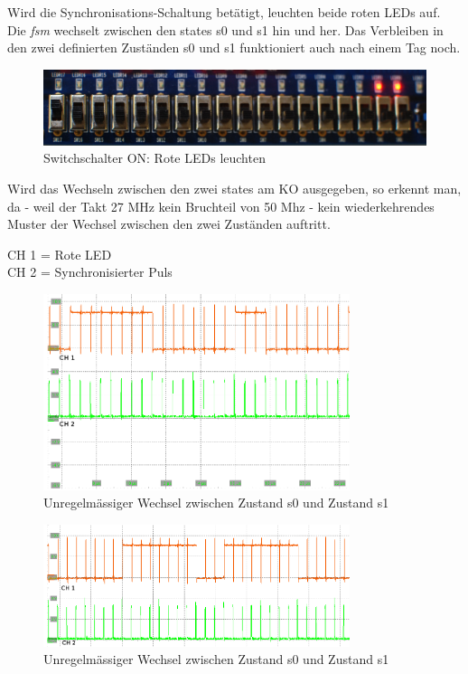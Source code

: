 Wird die Synchronisations-Schaltung betätigt, leuchten beide roten LEDs auf. Die \textit{fsm} wechselt zwischen den states s0 und s1 hin und her. Das Verbleiben in den zwei definierten Zuständen s0 und s1 funktioniert auch nach einem Tag noch.

\begin{figure}[H]
	\includegraphics[width=1\textwidth]{images/metastability/synchronized.JPG}
	\caption{Switchschalter ON: Rote LEDs leuchten}
	\label{fig.metastabil.Ergebnis_BoardSynchron}
\end{figure}

\newpage
Wird das Wechseln zwischen den zwei states am KO ausgegeben, so erkennt man, da - weil der Takt 27 MHz kein Bruchteil von 50 Mhz - kein wiederkehrendes Muster der Wechsel zwischen den zwei Zuständen auftritt.

CH 1 = Rote LED\\
CH 2 = Synchronisierter Puls

\begin{figure}[H]
	\includegraphics[width=0.8\textwidth]{images/metastability/synchron_eng_2.png}
	\caption{Unregelmässiger Wechsel zwischen Zustand s0 und Zustand s1}
	\label{fig.metastabil.Ergebnis_1}
\end{figure}

\begin{figure}[H]
	\includegraphics[width=0.8\textwidth]{images/metastability/synchron_eng_3.png}
	\caption{Unregelmässiger Wechsel zwischen Zustand s0 und Zustand s1}
	\label{fig.metastabil.Ergebnis_2}
\end{figure}

